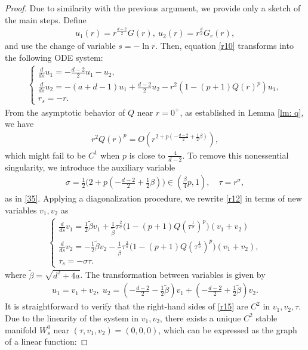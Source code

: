 \documentclass[12pt]{amsart}
\begin{document}
\begin{proof} Due to similarity with the previous argument, we provide only a sketch of the main steps. Define
\begin{align}\label{r11.1}
u_1(r)=r^{\frac{d-2}2}G(r), \ u_2(r)=r^{\frac d 2} G_r(r),
\end{align}
and use the change of variable $s=-\ln r$. Then, equation \eqref{r10} transforms into the following ODE system: 
\begin{align}\label{r12}
\begin{cases}
\tfrac d{ds} u_1=-\tfrac{d-2}2 u_1-u_2,\\
\tfrac d{ds} u_2=-(a+d-1)u_1+\tfrac{d-2}2 u_2-r^2(1-(p+1)Q(r)^p)u_1,\\
r_s=-r. 
\end{cases}
\end{align}
From the asymptotic behavior of $Q$ near $r=0^+$, as established in Lemma \ref{lm: q}, we have
\begin{align*}
r^2 Q(r)^p=O(r^{2+p(-\frac{d-2}2+\frac 12\beta)}), 
\end{align*}
which might fail to be $C^1$ when $p$ is close to $\tfrac 4{d-2}$. To remove this nonessential singularity, we introduce the auxiliary variable
\begin{align}\label{r13}
\sigma=\tfrac 12\bigl(2+p(-\tfrac{d-2}2+\tfrac 12\beta)\bigr) \in (\tfrac \beta4 p, 1), \quad \tau=r^\sigma, 
\end{align}
as in \eqref{35}. Applying a diagonalization procedure, we rewrite \eqref{r12} in terms of new variables $v_1, v_2$ as 
\begin{align}\label{r15}
\begin{cases}
\tfrac d{ds} v_1=\tfrac 12 \tilde \beta v_1+\tfrac 1{\tilde \beta}\tau^{\frac 2{\sigma}}\bigl(1-(p+1)Q(\tau^{\tfrac 1\sigma})^p\bigr)(v_1+v_2)\\
\tfrac d{ds} v_2=-\tfrac 12 \tilde \beta v_2-\tfrac 1{\tilde \beta}\tau^{\frac 2\sigma}\bigl(1-(p+1)Q(\tau^{\tfrac 1\sigma})^p\bigr)(v_1+v_2),\\
\tau_s =-\sigma \tau. 
\end{cases}
\end{align}
where $\tilde \beta=\sqrt{d^2+4a}$. The transformation between variables is given by
\begin{align}\label{r16}
u_1=v_1+v_2, \; u_2=(-\tfrac{d-2}2-\tfrac 12 \tilde \beta)v_1+(-\tfrac{d-2}2+\tfrac 12 \tilde \beta)v_2. 
\end{align}
It is straightforward to verify that the right-hand sides of \eqref{r15} are $C^2$ in $v_1, v_2,\tau$. Due to the linearity of the system in $v_1, v_2$, there exists a unique $C^2$ stable manifold $W^0_s$ near $(\tau, v_1, v_2)=(0,0,0)$, which can be expressed as the graph of a linear function:

\end{proof}
\end{document}
